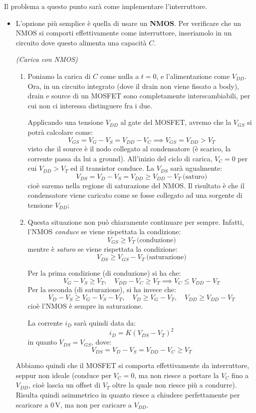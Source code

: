 \documentclass[a4paper,11pt]{article}
\begin{document}
Il problema a questo punto sarà come implementare l'interruttore.
\begin{itemize}
\item L'opzione più semplice è quella di usare un \textbf{NMOS}. Per verificare che un NMOS si comporti effettivamente come interruttore, inseriamolo in un circuito dove questo alimenta una capacità $C$.

\par\smallskip
\textit{(Carica con NMOS)}
\begin{enumerate}
	\item 
Poniamo la carica di $C$ come nulla a $t = 0$, e l'alimentazione come $V_{DD}$. Ora, in un circuito integrato (dove il drain non viene fissato a body), drain e source di un MOSFET sono completamente interscambiabili, per cui non ci interessa distinguere fra i due.

Applicando una tensione $V_{DD}$ al gate del MOSFET, avremo che la $V_{GS}$ si potrà calcolare come:
$$
V_{GS} = V_G - V_S = V_{DD} - V_{C} \implies V_{GS} = V_{DD} > V_T
$$
visto che il source è il nodo collegato al condensatore (è scarico, la corrente passa da lui a ground). All'inizio del ciclo di carica, $V_C = 0$ per cui $V_{DD} > V_T$ ed il transistor conduce. La $V_{DS}$ sarà ugualmente:
$$
V_{DS} = V_D - V_S = V_{DD} \geq V_{DD} - V_T \ \text{(saturo)}
$$
cioè saremo nella regione di saturazione del NMOS. Il risultato è che il condensatore viene caricato come se fosse collegato ad una sorgente di tensione $V_{DD}$;
	\item 
Questa situazione non può chiaramente continuare per sempre. Infatti, l'NMOS \textit{conduce} se viene rispettata la condizione:
$$
V_{GS} \geq V_T \ \text{(conduzione)}
$$
mentre è \textit{saturo} se viene rispettata la condizione:
$$
V_{DS} \geq V_{GS} - V_T \ \text{(saturazione)}
$$

Per la prima condizione (di conduzione) si ha che:
$$
V_G - V_S \geq V_T, \quad V_{DD} - V_C \geq V_T \implies V_C \leq V_{DD} - V_T
$$
Per la seconda (di saturazione), si ha invece che:
$$
V_D - V_S \geq V_G - V_S - V_T, \quad V_D \geq V_G - V_T, \quad V_{DD} \geq V_{DD} - V_T 
$$
cioè l'NMOS è sempre in saturazione. 

La corrente $i_D$ sarà quindi data da:
$$
i_D = K \left( V_{DS} - V_T \right)^2
$$
in quanto $V_{DS} = V_{GS}$, dove:
$$
V_{DS} = V_D - V_S = V_{DD} - V_C \geq V_T
$$

\end{enumerate}

Abbiamo quindi che il MOSFET si comporta effettivamente da interruttore, seppur non ideale (conduce per $V_C = 0$, ma non riesce a portare la $V_C$ fino a $V_{DD}$, cioè lascia un offset di $V_T$ oltre la quale non riesce più a condurre).
Risulta quindi asimmetrico in quanto riesce a chiudere perfettamente per scaricare a $0 \, \mathrm{V}$, ma non per caricare a $V_{DD}$. 


\end{itemize}
\end{document}
